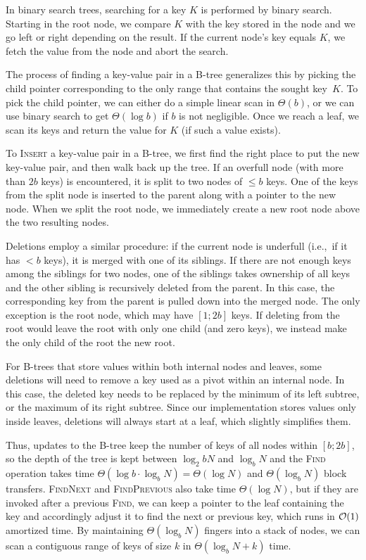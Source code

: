 In binary search trees, searching for a key $K$ is performed by binary search.
Starting in the root node, we compare $K$ with the key stored in the node
and we go left or right depending on the result. If the current node's key
equals $K$, we fetch the value from the node and abort the search.

The process of finding a key-value pair in a B-tree generalizes this
by picking the child pointer corresponding to the only range that contains
the sought key~$K$. To pick the child pointer, we can either do a simple
linear scan in $\Theta(b)$, or we can use binary search to get
$\Theta(\log b)$ if $b$ is not negligible.
Once we reach a leaf, we scan its keys and return the value for $K$
(if such a value exists).

To \textsc{Insert} a key-value pair in a B-tree, we first find the right
place to put the new key-value pair, and then walk back up the tree.
If an overfull node (with more than $2b$ keys) is encountered, it is split
to two nodes of $\leq b$ keys. One of the keys from the split node
is inserted to the parent along with a pointer to the new node.
When we split the root node, we immediately create a new root node above the
two resulting nodes.

Deletions employ a similar procedure: if the current node is underfull
(i.e.,\ if it has $< b$ keys), it is merged with one of its siblings.
If there are not enough keys among the siblings for two nodes,
one of the siblings takes ownership of all keys and the other sibling
is recursively deleted from the parent. In this case, the corresponding
key from the parent is pulled down into the merged node.
The only exception is the root node, which may have $[1;2b]$ keys.
If deleting from the root would leave the root with only one child
(and zero keys), we instead make the only child of the root the new root.

For B-trees that store values within both internal nodes and leaves,
some deletions will need to remove a key used as a pivot within an internal
node. In this case, the deleted key needs to be replaced by the minimum of its
left subtree, or the maximum of its right subtree.
Since our implementation stores values only inside leaves, deletions will
always start at a leaf, which slightly simplifies them.

Thus, updates to the B-tree keep the number of keys of all nodes within
$[b;2b]$, so the depth of the tree is kept between $\log_2b N$ and $\log_b N$
and the \textsc{Find} operation takes time
$\Theta(\log b \cdot \log_b N)=\Theta(\log N)$ and $\Theta(\log_b N)$
block transfers. \textsc{FindNext} and \textsc{FindPrevious} also take time
$\Theta(\log N)$, but if they are invoked after a previous \textsc{Find}, we
can keep a pointer to the leaf containing the key and accordingly adjust it to
find the next or previous key, which runs in $\mathcal{O}(1)$ amortized time.
By maintaining $\Theta(\log_b N)$ fingers into a stack of nodes, we can
scan a contiguous range of keys of size $k$ in $\Theta(\log_b N + k)$ time.


